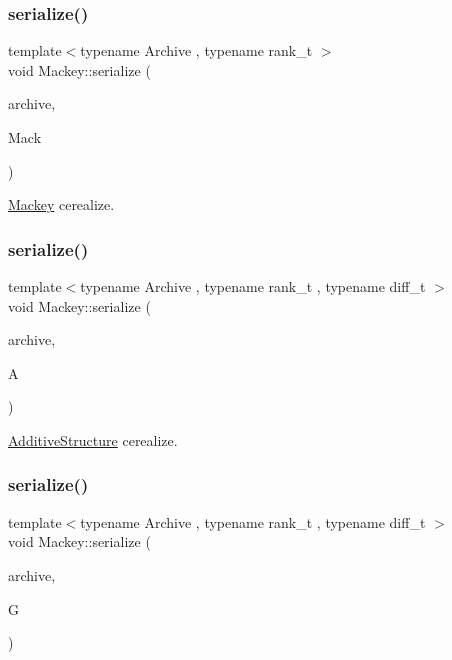 \subsubsection{\texorpdfstring{serialize()}{serialize()}\hspace{0.1cm}{\footnotesize\ttfamily [2/5]}}
{\footnotesize\ttfamily template$<$typename Archive , typename rank\+\_\+t $>$ \\
void Mackey\+::serialize (\begin{DoxyParamCaption}\item[{Archive \&}]{archive,  }\item[{\hyperlink{classMackey_1_1MackeyFunctor}{Mackey\+Functor}$<$ rank\+\_\+t $>$ \&}]{Mack }\end{DoxyParamCaption})}



\hyperlink{namespaceMackey}{Mackey} cerealize. 

\mbox{\label{namespaceMackey_a73c4c78b9c9858acc875da9516535d4b}} 
\subsubsection{\texorpdfstring{serialize()}{serialize()}\hspace{0.1cm}{\footnotesize\ttfamily [3/5]}}
{\footnotesize\ttfamily template$<$typename Archive , typename rank\+\_\+t , typename diff\+\_\+t $>$ \\
void Mackey\+::serialize (\begin{DoxyParamCaption}\item[{Archive \&}]{archive,  }\item[{\hyperlink{classMackey_1_1AdditiveStructure}{Additive\+Structure}$<$ rank\+\_\+t, diff\+\_\+t $>$ \&}]{A }\end{DoxyParamCaption})}



\hyperlink{classMackey_1_1AdditiveStructure}{Additive\+Structure} cerealize. 

\mbox{\label{namespaceMackey_ae6ccf7fecc4fc52a3c7b31876106ae2c}} 
\subsubsection{\texorpdfstring{serialize()}{serialize()}\hspace{0.1cm}{\footnotesize\ttfamily [4/5]}}
{\footnotesize\ttfamily template$<$typename Archive , typename rank\+\_\+t , typename diff\+\_\+t $>$ \\
void Mackey\+::serialize (\begin{DoxyParamCaption}\item[{Archive \&}]{archive,  }\item[{\hyperlink{classMackey_1_1Green}{Green}$<$ rank\+\_\+t, diff\+\_\+t $>$ \&}]{G }\end{DoxyParamCaption})}



